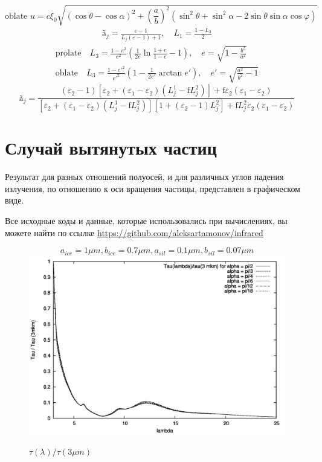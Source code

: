 \documentclass[a4paper,10pt]{article}
\begin{document}
\begin{equation}
  \text{oblate    } u=c\xi_0\sqrt{(\cos\theta-\cos\alpha)^2+\left(\frac{a}{b}\right)^{2}(\sin^2\theta+\sin^2\alpha-2\sin\theta\sin\alpha\cos\varphi)} 
\end{equation}
\begin{eqnarray}
 \text{\~{a}}_j = \frac{\varepsilon-1}{L_j(\varepsilon-1)+1},\quad L_1=\frac{1-L_3}{2}
\end{eqnarray}
\begin{eqnarray}
  \text{prolate}\quad L_3 = \frac{1-e^2}{e^2}\left(\frac{1}{2e}\ln\frac{1+e}{1-e}-1\right),\quad e=\sqrt{1-\frac{b^2}{a^2}}\\
  \text{oblate}\quad L_3 = \frac{1-e'^2}{e'^2}\left(1 - \frac{1}{2e'}\arctan{e'}\right),\quad e'=\sqrt{\frac{a^2}{b^2}-1}
\end{eqnarray}
\begin{equation}
 \text{\~{a}}_j = \frac{(\varepsilon_2-1)[\varepsilon_2+(\varepsilon_1-\varepsilon_2)(L^{1}_{j} - \text{\~{f}}L^2_j)]
	    +\text{\~{f}}\varepsilon_2(\varepsilon_1-\varepsilon_2)}
	    {[\varepsilon_2+(\varepsilon_1-\varepsilon_2)(L^{1}_{j} - \text{\~{f}}L^2_j)][1+(\varepsilon_2-1)L^2_j]+
	    \text{\~{f}}L^2_j\varepsilon_2(\varepsilon_1-\varepsilon_2)} 
\end{equation}
\section{Случай вытянутых частиц}
\par
Результат для разных отношений полуосей, и для различных углов падения излучения,
по отношению к оси вращения частицы, представлен в графическом виде.
\par Все исходные коды и данные, которые использовались при вычислениях, вы можете найти по ссылке \url{https://github.com/aleksartamonov/infrared}


\begin{figure}[p]
$$a_{ice} = 1 \mu m,b_{ice} = 0.7 \mu m , a_{sil} = 0.1 \mu m , b_{sil} = 0.07  \mu m $$
 \includegraphics{../plots/tau-1-07.jpg}
 \caption{$\tau(\lambda)/\tau(3\mu m)$ }
\end{figure}
\end{document}
